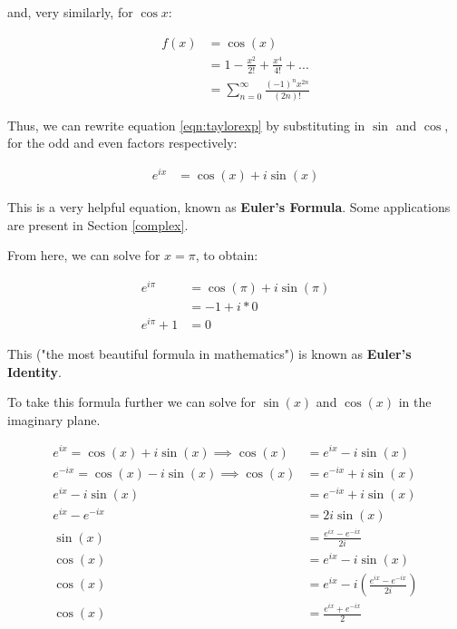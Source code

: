 \documentclass[12pt]{article}
\begin{document}
and, very similarly, for $\cos x$:

\begin{equation}
    \begin{split}
        f(x) &= \cos(x) \\
        &= 1 - \frac{x^2}{2!} + \frac{x^4}{4!} + ...\\
        &= \sum_{n=0}^{\infty} \frac{(-1)^n x^{2n}}{(2n)!}
    \end{split}
\end{equation}

Thus, we can rewrite equation \ref{eqn:taylorexp} by substituting in $\sin$ and $\cos$, for the odd and even factors respectively:

\begin{equation}
    \begin{split}
        e^{ix} &= \cos(x) + i\sin(x)
    \end{split}
\end{equation}

This is a very helpful equation, known as \textbf{Euler's Formula}. Some applications are present in Section \ref{complex}.

From here, we can solve for $x=\pi$, to obtain:

\begin{equation}
    \begin{split}
        e^{i\pi} &= \cos(\pi) + i \sin(\pi)\\
        &= -1 + i*0\\
        e^{i\pi}+1 &= 0
    \end{split}
\end{equation}

This ("the most beautiful formula in mathematics") is known as \textbf{Euler's Identity}.

To take this formula further we can solve for $\sin(x)$ and $\cos(x)$ in the imaginary plane. 

\begin{equation}
    \begin{split}
        e^{ix} = \cos(x) + i\sin(x) \implies \cos(x) &= e^{ix} - i\sin(x)\\
        e^{-ix} = \cos(x) - i\sin(x) \implies \cos(x) &= e^{-ix} +i\sin(x)\\
        e^{ix} - i\sin(x) &= e^{-ix} + i\sin(x)\\
        e^{ix}-e^{-ix} &= 2i\sin(x)\\
        \sin(x) &= \frac{e^{ix}-e^{-ix}}{2i}\\
        \cos(x) &= e^{ix}-i\sin(x)\\
        \cos(x) &=e^{ix}-i(\frac{e^{ix}-e^{-ix}}{2i})\\
        \cos(x) &= \frac{e^{ix}+e^{-ix}}{2}\\
    \end{split}
\end{equation}
\end{document}
